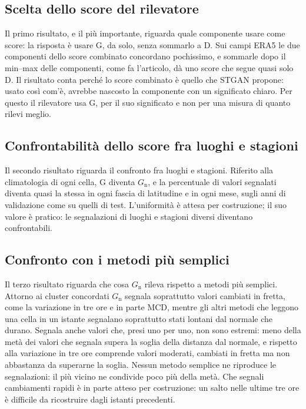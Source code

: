 \subsection{Scelta dello score del rilevatore}
Il primo risultato, e il più importante, riguarda quale componente usare come score: la risposta è usare G, da solo, senza sommarlo a D. Sui campi ERA5 le due componenti dello score combinato concordano pochissimo, e sommarle dopo il min--max delle componenti, come fa l'articolo, dà uno score che segue quasi solo D. Il risultato conta perché lo score combinato è quello che STGAN propone: usato così com'è, avrebbe nascosto la componente con un significato chiaro. Per questo il rilevatore usa G, per il suo significato e non per una misura di quanto rilevi meglio.

\subsection{Confrontabilità dello score fra luoghi e stagioni}
Il secondo risultato riguarda il confronto fra luoghi e stagioni. Riferito alla climatologia di ogni cella, G diventa $G_{\mathrm{n}}$, e la percentuale di valori segnalati diventa quasi la stessa in ogni fascia di latitudine e in ogni mese, sugli anni di validazione come su quelli di test. L'uniformità è attesa per costruzione; il suo valore è pratico: le segnalazioni di luoghi e stagioni diversi diventano confrontabili.

\subsection{Confronto con i metodi più semplici}
Il terzo risultato riguarda che cosa $G_{\mathrm{n}}$ rileva rispetto a metodi più semplici. Attorno ai cluster concordati $G_{\mathrm{n}}$ segnala soprattutto valori cambiati in fretta, come la variazione in tre ore e in parte MCD, mentre gli altri metodi che leggono una cella in un istante segnalano soprattutto stati lontani dal normale che durano. Segnala anche valori che, presi uno per uno, non sono estremi: meno della metà dei valori che segnala supera la soglia della distanza dal normale, e rispetto alla variazione in tre ore comprende valori moderati, cambiati in fretta ma non abbastanza da superarne la soglia. Nessun metodo semplice ne riproduce le segnalazioni: il più vicino ne condivide poco più della metà. Che segnali cambiamenti rapidi è in parte atteso per costruzione: un salto nelle ultime tre ore è difficile da ricostruire dagli istanti precedenti.

